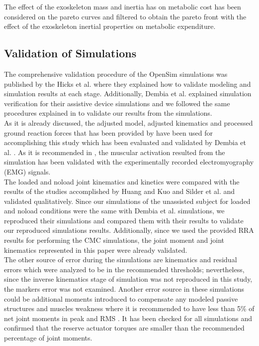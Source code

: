 \documentclass[10pt,letterpaper]{article}
\begin{document}
The effect of the exoskeleton mass and inertia has on metabolic cost has been considered on the pareto curves and filtered to obtain the pareto front with the effect of the exoskeleton inertial properties on metabolic expenditure.
\subsection*{Validation of Simulations}
The comprehensive validation procedure of the OpenSim simulations was published by the Hicks et al. \cite{92} where they explained how to validate modeling and simulation results at each stage. Additionally, Dembia et al. \cite{93} explained simulation verification for their assistive device simulations and we followed the same procedures explained in \cite{92,93} to validate our results from the simulations.\\
As it is already discussed, the adjusted model, adjusted kinematics and processed ground reaction forces that has been provided by \cite{93} have been used for accomplishing this study which has been evaluated and validated by Dembia et al. \cite{93}. As it is recommended in \cite{92}, the muscular activation resulted from the simulation has been validated with the experimentally recorded electromyography (EMG) signals.\\
The loaded and noload joint kinematics and kinetics were compared with the results of the studies accomplished by Huang and Kuo \cite{131} and Silder et al.\cite{132} and validated qualitatively. Since our simulations of the unassisted subject for loaded and noload conditions were the same with Dembia et al. simulations, we reproduced their simulations and compared them with their results to validate our reproduced simulations results. Additionally, since we used the provided RRA results for performing the CMC simulations, the joint moment and joint kinematics represented in this paper were already validated.\\
The other source of error during the simulations are kinematics and residual errors which were analyzed to be in the recommended thresholds\cite{92}; nevertheless, since the inverse kinematics stage of simulation was not reproduced in this study, the markers error was not examined. Another error source in these simulations could be additional moments introduced to compensate any modeled passive structures and muscles weakness where it is recommended to have less than 5\% of net joint moments in peak and RMS \cite{92}. It has been checked for all simulations and confirmed that the reserve actuator torques are smaller than the recommended percentage of joint moments.
\end{document}
